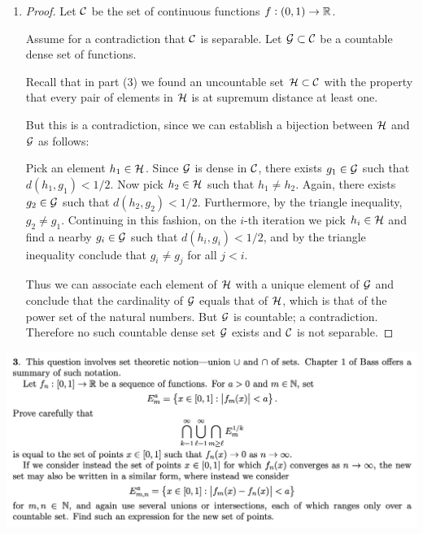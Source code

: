 \begin{enumerate}[label=(2.\arabic*)]
\item
  \begin{proof}
    Let $\mathcal C$ be the set of continuous functions $f: (0, 1) \to \mathbb{R}$.

    Assume for a contradiction that $\mathcal C$ is separable. Let $\mathcal G \subset \mathcal C$ be a countable dense set of
    functions.

    Recall that in part (3) we found an uncountable set $\mathcal H \subset \mathcal C$ with the property that every pair
    of elements in $\mathcal H$ is at supremum distance at least one.

    But this is a contradiction, since we can establish a bijection between $\mathcal H$ and $\mathcal G$ as follows:

    Pick an element $h_1 \in \mathcal H$. Since $\mathcal G$ is dense in $\mathcal C$, there exists $g_1 \in \mathcal G$ such
    that $d(h_1, g_1) < 1/2$. Now pick $h_2 \in \mathcal H$ such that $h_1 \neq h_2$. Again, there
    exists $g_2 \in \mathcal G$ such that $d(h_2, g_2) < 1/2$. Furthermore, by the triangle
    inequality, $g_2 \neq g_1$. Continuing in this fashion, on the $i$-th iteration we pick $h_i \in \mathcal H$ and
    find a nearby $g_i \in \mathcal G$ such that $d(h_i, g_i) < 1/2$, and by the triangle inequality conclude
    that $g_i \neq g_j$ for all $j < i$.

    Thus we can associate each element of $\mathcal H$ with a unique element of $\mathcal G$ and conclude that the
    cardinality of $\mathcal G$ equals that of $\mathcal H$, which is that of the power set of the natural numbers.
    But $\mathcal G$ is countable; a contradiction. Therefore no such countable dense set $\mathcal G$ exists and $\mathcal C$
    is not separable.
  \end{proof}
\end{enumerate}


\newpage
\begin{mdframed}
  \includegraphics[width=400pt]{img/analysis--berkeley-202a--homework-1-8349.png}
\end{mdframed}


